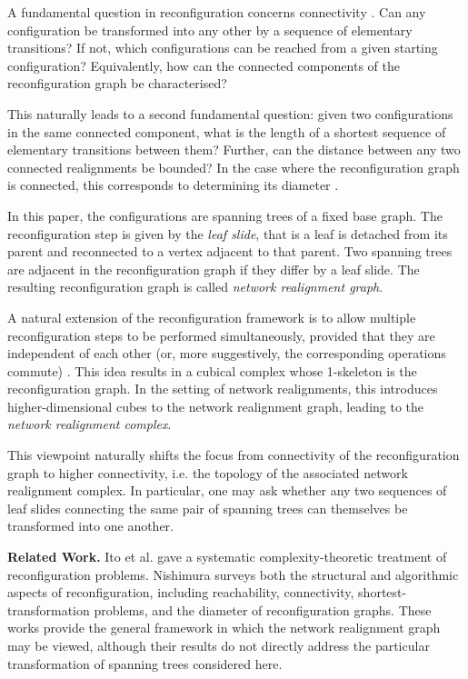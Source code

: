 \documentclass[reqno,dvipsnames]{amsart}
\theoremstyle{plain}
\numberwithin{equation}{section}
\theoremstyle{definition}
\begin{document}
A fundamental question in reconfiguration concerns connectivity \cite{Nishimura18}. Can any configuration be transformed into any other by a sequence of elementary transitions? If not, which configurations can be reached from a given starting configuration? Equivalently, how can the connected components of the reconfiguration graph be characterised? 

This naturally leads to a second fundamental question: given two configurations in the same connected component, what is the length of a shortest sequence of elementary transitions between them? Further, can the distance between any two connected realignments be bounded? In the case where the reconfiguration graph is connected, this corresponds to determining its diameter \cite{Reconfiguration}.

In this paper, the configurations are spanning trees of a fixed base graph. The reconfiguration step is given by the \textit{leaf slide}, that is a leaf is detached from its parent and reconnected to a vertex adjacent to that parent. Two spanning trees are adjacent in the reconfiguration graph if they differ by a leaf slide. The resulting reconfiguration graph is called \textit{network realignment graph}.

A natural extension of the reconfiguration framework is to allow multiple reconfiguration steps to be performed simultaneously, provided that they are independent of each other (or, more suggestively, the corresponding operations commute) \cite{Ghrist07}. This idea results in a cubical complex whose 1-skeleton is the reconfiguration graph. In the setting of network realignments, this introduces higher-dimensional cubes to the network realignment graph, leading to the \textit{network realignment complex}.

This viewpoint naturally shifts the focus from connectivity of the reconfiguration graph to higher connectivity, i.e. the topology of the associated network realignment complex. In particular, one may ask whether any two sequences of leaf slides connecting the same pair of spanning trees can themselves be transformed into one another.

\bigskip

\noindent\textbf{Related Work.} Ito et al. \cite{Ito11} gave a systematic complexity-theoretic treatment of reconfiguration problems. Nishimura \cite{Nishimura18} surveys both the structural and algorithmic aspects of reconfiguration, including reachability, connectivity, shortest-transformation problems, and the diameter of reconfiguration graphs. These works provide the general framework in which the network realignment graph may be viewed, although their results do not directly address the particular transformation of spanning trees considered here.
\end{document}
